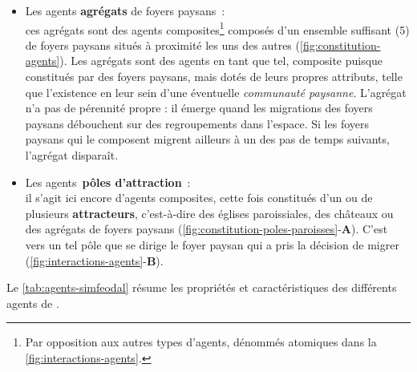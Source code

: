\begin{itemize}
	\item Les agents \og \textbf{agrégats} de foyers paysans\fg{} : \\
	ces agrégats sont des agents \og composites\fg{}\footnote{
	Par opposition aux autres types d'agents, dénommés \og atomiques\fg{} dans la \cref{fig:interactions-agents}.
	} composés d'un ensemble suffisant (5) de foyers paysans situés à proximité les uns des autres (\cref{fig:constitution-agents}).
	Les agrégats sont des agents en tant que tel, composite puisque constitués par des foyers paysans, mais dotés de leurs propres attributs, telle que l'existence en leur sein d'une éventuelle \textit{communauté paysanne}.
	L'agrégat n'a pas de pérennité propre : il émerge quand les migrations des foyers paysans débouchent sur des regroupements dans l'espace.
	Si les foyers paysans qui le composent migrent ailleurs à un des pas de temps suivants, l'agrégat disparaît.
	
	\item Les agents \og \textbf{pôles d'attraction}\fg{} : \\
	il s'agit ici encore d'agents composites, cette fois constitués d'un ou de plusieurs \textbf{attracteurs}, c'est-à-dire des églises paroissiales, des châteaux ou des agrégats de foyers paysans (\cref{fig:constitution-poles-paroisses}-\textbf{A}).
	C'est vers un tel pôle que se dirige le foyer paysan qui a pris la décision de migrer (\cref{fig:interactions-agents}-\textbf{B}).
\end{itemize}

Le \cref{tab:agents-simfeodal} résume les propriétés et caractéristiques des différents agents de \simfeodal{}.
\clearpage

